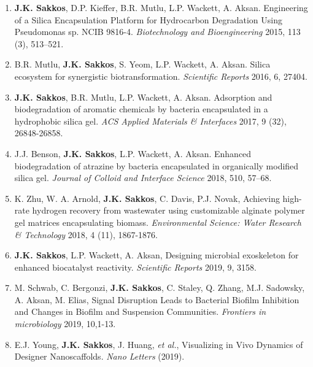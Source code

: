 

\begin{cvparagraph}
\begin{enumerate}
	\item	{\textbf{J.K. Sakkos}, D.P. Kieffer, B.R. Mutlu, L.P. Wackett, A. Aksan. Engineering of a Silica Encapsulation Platform for Hydrocarbon Degradation Using Pseudomonas sp. NCIB 9816-4. \textit{Biotechnology and Bioengineering} 2015, 113 (3), 513–521.}
	\item	{B.R. Mutlu, \textbf{J.K. Sakkos}, S. Yeom, L.P. Wackett, A. Aksan. Silica ecosystem for synergistic biotransformation. \textit{Scientific Reports} 2016, 6, 27404.}
	\item {\textbf{J.K. Sakkos}, B.R. Mutlu, L.P. Wackett, A. Aksan. Adsorption and biodegradation of aromatic chemicals by bacteria encapsulated in a hydrophobic silica gel. \textit{ACS Applied Materials \& Interfaces} 2017, 9 (32), 26848-26858.}
	\item {J.J. Benson, \textbf{J.K. Sakkos}, L.P. Wackett, A. Aksan. Enhanced biodegradation of atrazine by bacteria encapsulated in organically modified silica gel. \textit{Journal of Colloid and Interface Science} 2018, 510, 57–68.}
	\item {K. Zhu, W. A. Arnold, \textbf{J.K. Sakkos}, C. Davis, P.J. Novak, Achieving high-rate hydrogen recovery from wastewater using customizable alginate polymer gel matrices encapsulating biomass. \textit{Environmental Science: Water Research \& Technology} 2018, 4 (11), 1867-1876.}
	\item {\textbf{J.K. Sakkos}, L.P. Wackett, A. Aksan, Designing microbial exoskeleton for enhanced biocatalyst reactivity. \textit{Scientific Reports} 2019, 9,  3158.}
	\item {M. Schwab, C. Bergonzi, \textbf{J.K. Sakkos}, C. Staley, Q. Zhang, M.J. Sadowsky, A. Aksan, M. Elias, Signal Disruption Leads to Bacterial Biofilm Inhibition and Changes in Biofilm and Suspension Communities. \textit{Frontiers in microbiology} 2019, 10,1-13.}
	\item {E.J. Young, \textbf{J.K. Sakkos}, J. Huang, \textit{et al.}, Visualizing in Vivo Dynamics of Designer Nanoscaffolds. \textit{Nano Letters} (2019).}
	\cite{sakkosOrthogonalDegronSystem2021}

\end{enumerate}
\end{cvparagraph}
